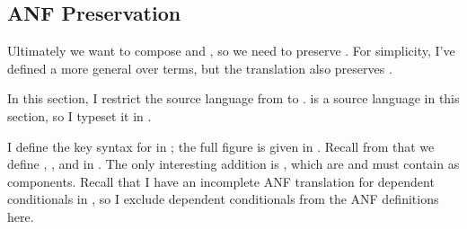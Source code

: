 \subsection{ANF Preservation}
\label{sec:abs-cc:cc:anf}
Ultimately we want to compose  and , so we
need  to preserve .
For simplicity, I've defined a more general  over
\slang terms, but the translation also preserves .

\begin{typographical}
  In this section, I restrict the source language from \slang to
  \anftlang.
  \anftlang is a source language in this section, so I typeset it in
  \emph{}.
\end{typographical}

\FigCCANF
I define the key  syntax for \tlang in ;
the full figure is given in 
.
Recall from  that we define
,
, and  in .
The only interesting addition is , which are  and
must contain  as components.
Recall that I have an incomplete ANF translation for dependent conditionals in
, so I exclude dependent conditionals from the ANF
definitions here.

